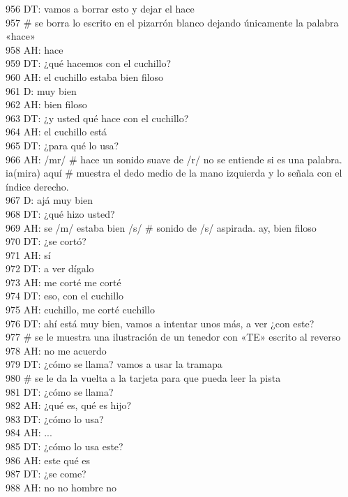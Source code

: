 956 DT: vamos a borrar esto y dejar el hace\\
957 # se borra lo escrito en el pizarrón blanco dejando únicamente la palabra «hace»\\
958 AH: hace\\
959 DT: ¿qué hacemos con el cuchillo?\\
960 AH: el cuchillo estaba bien filoso\\
961 D: muy bien\\
962 AH: bien filoso\\
963 DT: ¿y usted qué hace con el cuchillo?\\
964 AH: el cuchillo está\\
965 DT: ¿para qué lo usa?\\
966 AH: /mr/ # hace un sonido suave de /r/ no se entiende si es una palabra. ia(mira) aquí # muestra el dedo medio de la mano izquierda y lo señala con el índice derecho.\\
967 D: ajá muy bien\\
968 DT: ¿qué hizo usted?\\
969 AH: se /m/ estaba bien /s/ # sonido de /s/ aspirada. ay, bien filoso\\
970 DT: ¿se cortó?\\
971 AH: sí\\
972 DT: a ver dígalo\\
973 AH: me corté me corté\\
974 DT: eso, con el cuchillo\\
975 AH: cuchillo, me corté cuchillo\\
976 DT: ahí está muy bien, vamos a intentar unos más, a ver ¿con este?\\
977 # se le muestra una ilustración de un tenedor con «TE» escrito al reverso\\
978 AH: no me acuerdo\\
979 DT: ¿cómo se llama? vamos a usar la tramapa\\
980 # se le da la vuelta a la tarjeta para que pueda leer la pista\\
981 DT: ¿cómo se llama?\\
982 AH: ¿qué es, qué es hijo?\\
983 DT: ¿cómo lo usa?\\
984 AH: ...\\
985 DT: ¿cómo lo usa este?\\
986 AH: este qué es\\
987 DT: ¿se come?\\
988 AH: no no hombre no\\
